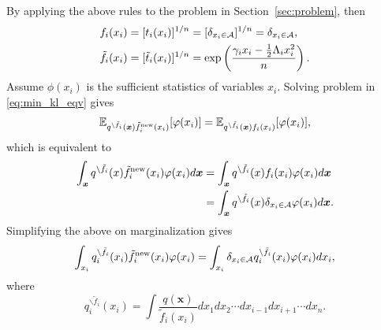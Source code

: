 \documentclass{article}
\begin{document}
By applying the above rules to the problem in Section~\ref{sec:problem}, then
\begin{align}
  f_i(x_i) &= [t_i(x_i)]^{1/n} = [\delta_{x_i \in \mathcal{A}}]^{1/n} = \delta_{x_i \in \mathcal{A}}, \\
  \tilde{f}_{i}(x_i) &= [\tilde{t}_i(x_i)]^{1/n} = \exp\left(\frac{\gamma_i x_i - \frac{1}{2}\Lambda_i x_i^2}{n}\right).
\end{align}
Assume $\phi(x_i)$ is the sufficient statistics of variables $x_i$. Solving problem in \eqref{eq:min_kl_eqv} gives
\begin{align}
  \mathbb{E}_{q^{\backslash \tilde{f}_i}(\bm{x}) \tilde{f}^{\mathrm{new}}_i(x_i)}[\varphi(x_i)] = \mathbb{E}_{q^{\backslash \tilde{f}_i}(\bm{x})f_i(x_i)}[\varphi(x_i)],
\end{align}
which is equivalent to 
\begin{align}
  \int_{\bm{x}} q^{\backslash \tilde{f}_i}(x)\tilde{f}^{\mathrm{new}}_i(x_i) \varphi(x_i) d\bm{x} &= \int_{\bm{x}} q^{\backslash \tilde{f}_i}(x){f}_i(x_i) \varphi(x_i) d\bm{x} \\
                                                                                               &= \int_{\bm{x}} q^{\backslash \tilde{f}_i}(x)\delta_{x_i \in \mathcal{A}} \varphi(x_i) d\bm{x}.
\end{align}
Simplifying the above on marginalization gives
\begin{equation}
  \int_{x_i} q_i^{\backslash\tilde{f}_i}(x_i) \tilde{f}_i^{\mathrm{new}}(x_i) \varphi(x_i) = \int_{x_i} \delta_{x_i \in \mathcal{A}} q_i^{\backslash \tilde{f}_i}(x_i) \varphi(x_i) d x_i,
\end{equation}
where
\begin{equation}
  q_i^{\backslash\tilde{f}_i}(x_i) = \int \frac{q(\bm{x})}{\tilde{f}_i(x_i)}d x_1 d x_2 \cdots d x_{i-1} d x_{i+1} \cdots d x_n.
\end{equation}
\end{document}
